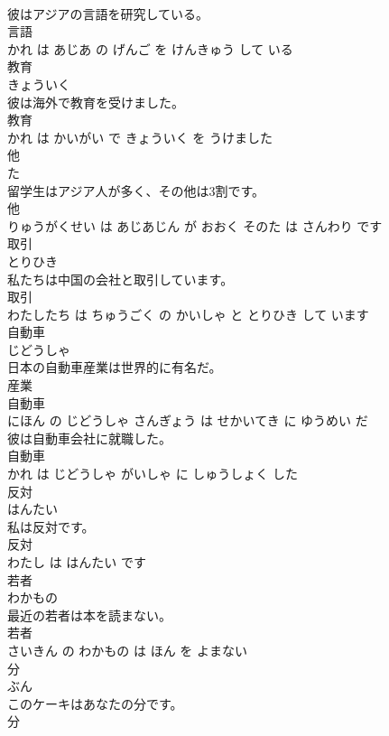 \documentclass[8pt]{extreport}
\begin{document}
\begin{CJK}{UTF8}{min}
\\	彼はアジアの言語を研究している。	
\\	言語 
\\	かれ は あじあ の げんご を けんきゅう して いる			
\\	教育	
\\	きょういく			
\\	彼は海外で教育を受けました。	
\\	教育 
\\	かれ は かいがい で きょういく を うけました			
\\	他	
\\	た			
\\	留学生はアジア人が多く、その他は3割です。	
\\	他 
\\	りゅうがくせい は あじあじん が おおく そのた は さんわり です			
\\	取引	
\\	とりひき			
\\	私たちは中国の会社と取引しています。	
\\	取引 
\\	わたしたち は ちゅうごく の かいしゃ と とりひき して います			
\\	自動車	
\\	じどうしゃ			
\\	日本の自動車産業は世界的に有名だ。	
\\	産業 
\\	自動車 
\\	にほん の じどうしゃ さんぎょう は せかいてき に ゆうめい だ			
\\	彼は自動車会社に就職した。	
\\	自動車 
\\	かれ は じどうしゃ がいしゃ に しゅうしょく した			
\\	反対	
\\	はんたい			
\\	私は反対です。	
\\	反対 
\\	わたし は はんたい です			
\\	若者	
\\	わかもの			
\\	最近の若者は本を読まない。	
\\	若者 
\\	さいきん の わかもの は ほん を よまない			
\\	分	
\\	ぶん			
\\	このケーキはあなたの分です。	
\\	分 

\end{CJK}
\end{document}
